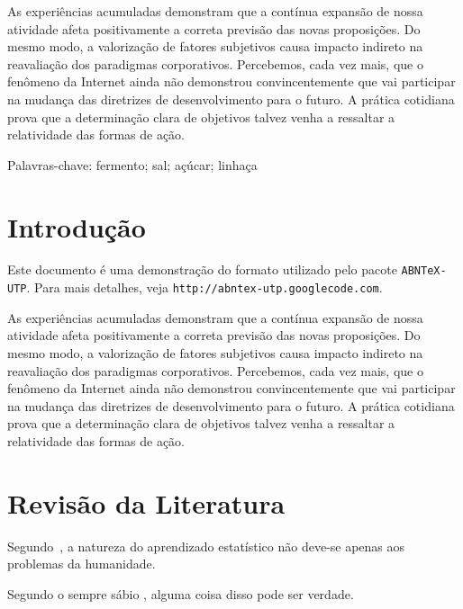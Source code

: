 \documentclass[font=plain,chapter=TITLE,section=Title,espaco=duplo,tocpage=plain,appendix=Name,floatnumber=continuous]{abnt}
\begin{document}


\UTPCapa
\UTPFalsaFolhaDeRosto
\UTPFolhaDeRosto

\begin{resumo}
As experiências acumuladas demonstram que a contínua expansão de nossa
atividade afeta positivamente a correta previsão das novas proposições. Do
mesmo modo, a valorização de fatores subjetivos causa impacto indireto na
reavaliação dos paradigmas corporativos. Percebemos, cada vez mais, que o
fenômeno da Internet ainda não demonstrou convincentemente que vai
participar na mudança das diretrizes de desenvolvimento para o futuro. A
prática cotidiana prova que a determinação clara de objetivos talvez venha
a ressaltar a relatividade das formas de ação.

Palavras-chave: fermento; sal; açúcar; linhaça
\end{resumo}

\listoffigures
\listoftables
\listadequadros
\sumario

\chapter{Introdução}

Este documento é uma demonstração do formato utilizado pelo pacote
\texttt{ABNTeX-UTP}. Para mais detalhes, veja
\texttt{http://abntex-utp.googlecode.com}.

As experiências acumuladas demonstram que a contínua expansão de nossa
atividade afeta positivamente a correta previsão das novas proposições. Do
mesmo modo, a valorização de fatores subjetivos causa impacto indireto na
reavaliação dos paradigmas corporativos. Percebemos, cada vez mais, que o
fenômeno da Internet ainda não demonstrou convincentemente que vai
participar na mudança das diretrizes de desenvolvimento para o futuro. A
prática cotidiana prova que a determinação clara de objetivos talvez venha
a ressaltar a relatividade das formas de ação. 

\chapter{Revisão da Literatura}

Segundo~\cite{joachims1998text}, a natureza do aprendizado estatístico não
deve-se apenas aos problemas da humanidade.

Segundo o sempre sábio ,
alguma coisa disso pode ser verdade.
\end{document}
